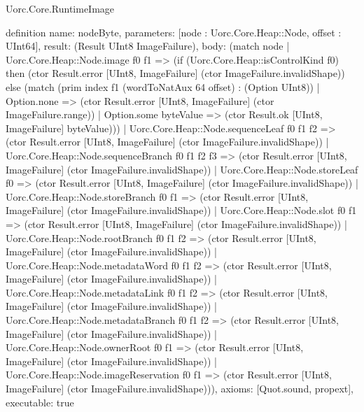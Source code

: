 \begin{lexlean}{Uorc.Core.RuntimeImage}
\begin{semanticmodule}
definition{
  name: nodeByte,
  parameters: [node : Uorc.Core.Heap::Node, offset : UInt64],
  result: (Result UInt8 ImageFailure),
  body: (match node
    | Uorc.Core.Heap::Node.image f0 f1 => (if (Uorc.Core.Heap::isControlKind f0) then (ctor Result.error [UInt8, ImageFailure] (ctor ImageFailure.invalidShape)) else (match (prim index f1 (wordToNatAux 64 offset) : (Option UInt8))
      | Option.none => (ctor Result.error [UInt8, ImageFailure] (ctor ImageFailure.range))
      | Option.some byteValue => (ctor Result.ok [UInt8, ImageFailure] byteValue)))
    | Uorc.Core.Heap::Node.sequenceLeaf f0 f1 f2 => (ctor Result.error [UInt8, ImageFailure] (ctor ImageFailure.invalidShape))
    | Uorc.Core.Heap::Node.sequenceBranch f0 f1 f2 f3 => (ctor Result.error [UInt8, ImageFailure] (ctor ImageFailure.invalidShape))
    | Uorc.Core.Heap::Node.storeLeaf f0 => (ctor Result.error [UInt8, ImageFailure] (ctor ImageFailure.invalidShape))
    | Uorc.Core.Heap::Node.storeBranch f0 f1 => (ctor Result.error [UInt8, ImageFailure] (ctor ImageFailure.invalidShape))
    | Uorc.Core.Heap::Node.slot f0 f1 => (ctor Result.error [UInt8, ImageFailure] (ctor ImageFailure.invalidShape))
    | Uorc.Core.Heap::Node.rootBranch f0 f1 f2 => (ctor Result.error [UInt8, ImageFailure] (ctor ImageFailure.invalidShape))
    | Uorc.Core.Heap::Node.metadataWord f0 f1 f2 => (ctor Result.error [UInt8, ImageFailure] (ctor ImageFailure.invalidShape))
    | Uorc.Core.Heap::Node.metadataLink f0 f1 f2 => (ctor Result.error [UInt8, ImageFailure] (ctor ImageFailure.invalidShape))
    | Uorc.Core.Heap::Node.metadataBranch f0 f1 f2 => (ctor Result.error [UInt8, ImageFailure] (ctor ImageFailure.invalidShape))
    | Uorc.Core.Heap::Node.ownerRoot f0 f1 => (ctor Result.error [UInt8, ImageFailure] (ctor ImageFailure.invalidShape))
    | Uorc.Core.Heap::Node.imageReservation f0 f1 => (ctor Result.error [UInt8, ImageFailure] (ctor ImageFailure.invalidShape))),
  axioms: [Quot.sound, propext],
  executable: true
}


\end{semanticmodule}
\end{lexlean}
